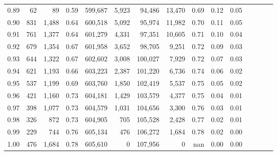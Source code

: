 \begin{tabular}{rrrcrrrrrrrrrrr}
0.89 &      62 &     89 &                                       0.59 &  599,687 &    5,923 &   94,486 &   13,470 &  0.69 &  0.12 &                         0.05 \\
0.90 &     831 &  1,488 &                                       0.64 &  600,518 &    5,092 &   95,974 &   11,982 &  0.70 &  0.11 &                         0.05 \\
0.91 &     761 &  1,377 &                                       0.64 &  601,279 &    4,331 &   97,351 &   10,605 &  0.71 &  0.10 &                         0.04 \\
0.92 &     679 &  1,354 &                                       0.67 &  601,958 &    3,652 &   98,705 &    9,251 &  0.72 &  0.09 &                         0.03 \\
0.93 &     644 &  1,322 &                                       0.67 &  602,602 &    3,008 &  100,027 &    7,929 &  0.72 &  0.07 &                         0.03 \\
0.94 &     621 &  1,193 &                                       0.66 &  603,223 &    2,387 &  101,220 &    6,736 &  0.74 &  0.06 &                         0.02 \\
0.95 &     537 &  1,199 &                                       0.69 &  603,760 &    1,850 &  102,419 &    5,537 &  0.75 &  0.05 &                         0.02 \\
0.96 &     421 &  1,160 &                                       0.73 &  604,181 &    1,429 &  103,579 &    4,377 &  0.75 &  0.04 &                         0.01 \\
0.97 &     398 &  1,077 &                                       0.73 &  604,579 &    1,031 &  104,656 &    3,300 &  0.76 &  0.03 &                         0.01 \\
0.98 &     326 &    872 &                                       0.73 &  604,905 &      705 &  105,528 &    2,428 &  0.77 &  0.02 &                         0.01 \\
0.99 &     229 &    744 &                                       0.76 &  605,134 &      476 &  106,272 &    1,684 &  0.78 &  0.02 &                         0.00 \\
1.00 &     476 &  1,684 &                                       0.78 &  605,610 &        0 &  107,956 &        0 &   nan &  0.00 &                         0.00 \\
\bottomrule
\end{tabular}
